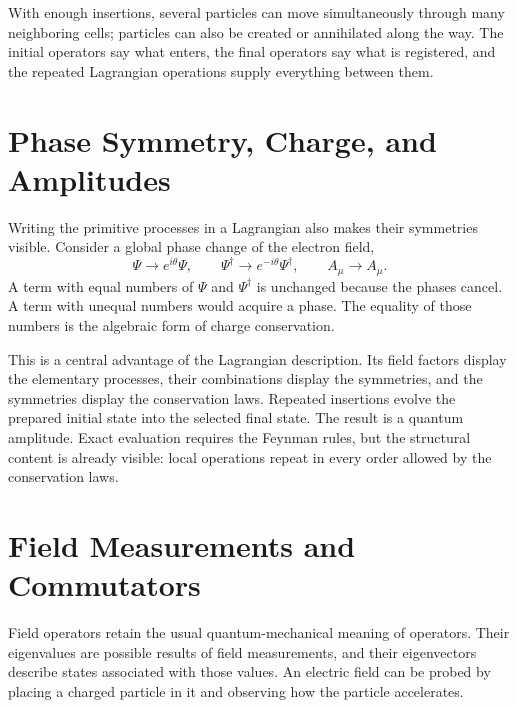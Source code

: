 With enough insertions, several particles can move simultaneously through many neighboring cells; particles can also be created or annihilated along the way. The initial operators say what enters, the final operators say what is registered, and the repeated Lagrangian operations supply everything between them.

\begin{classroomqa}
\end{classroomqa}

\section{Phase Symmetry, Charge, and Amplitudes}

Writing the primitive processes in a Lagrangian also makes their symmetries visible. Consider a global phase change of the electron field,
\begin{equation}
\Psi\longrightarrow e^{i\theta}\Psi,
\qquad
\Psi^\dagger\longrightarrow e^{-i\theta}\Psi^\dagger,
\qquad
A_\mu\longrightarrow A_\mu.
\end{equation}
A term with equal numbers of \(\Psi\) and \(\Psi^\dagger\) is unchanged because the phases cancel. A term with unequal numbers would acquire a phase. The equality of those numbers is the algebraic form of charge conservation.

This is a central advantage of the Lagrangian description. Its field factors display the elementary processes, their combinations display the symmetries, and the symmetries display the conservation laws. Repeated insertions evolve the prepared initial state into the selected final state. The result is a quantum amplitude. Exact evaluation requires the Feynman rules, but the structural content is already visible: local operations repeat in every order allowed by the conservation laws.

\section{Field Measurements and Commutators}

Field operators retain the usual quantum-mechanical meaning of operators. Their eigenvalues are possible results of field measurements, and their eigenvectors describe states associated with those values. An electric field can be probed by placing a charged particle in it and observing how the particle accelerates.

